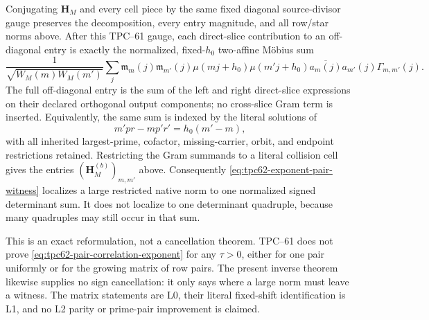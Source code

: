Conjugating \(\mathbf H_M\) and every cell piece by the same fixed diagonal
source-divisor gauge preserves the decomposition, every entry magnitude,
and all row/star norms above.  After this TPC--61 gauge, each direct-slice
contribution to an off-diagonal entry is exactly the normalized,
fixed-\(h_0\) two-affine M\"obius sum
\begin{equation}
 \frac{1}{\sqrt{W_M(m)W_M(m')}}
 \sum_j
 \mathfrak m_m(j)\mathfrak m_{m'}(j)
 \mu(mj+h_0)\mu(m'j+h_0)
 \overline{a_m(j)}a_{m'}(j)\Gamma_{m,m'}(j).
 \label{eq:tpc62-fixed-shift-pair-kernel}
\end{equation}
The full off-diagonal entry is the sum of the left and right direct-slice
expressions on their declared orthogonal output components; no cross-slice
Gram term is inserted.
Equivalently, the same sum is indexed by the literal solutions of
\begin{equation}
 m'pr-mp'r'=h_0(m'-m),
 \label{eq:tpc62-determinant-surface}
\end{equation}
with all inherited largest-prime, cofactor, missing-carrier, orbit, and
endpoint restrictions retained.  Restricting the Gram summands to a
literal collision cell gives the entries
\((\mathbf H_M^{(b)})_{m,m'}\) above.  Consequently
\eqref{eq:tpc62-exponent-pair-witness} localizes a large restricted native
norm to one normalized signed determinant sum.  It does not localize to one
determinant quadruple, because many quadruples may still occur in that sum.

This is an exact reformulation, not a cancellation theorem.  TPC--61 does
not prove \eqref{eq:tpc62-pair-correlation-exponent} for any
\(\tau>0\), either for one pair uniformly or for the growing matrix of row
pairs.  The present inverse theorem likewise supplies no sign cancellation:
it only says where a large norm must leave a witness.  The matrix statements
are L0, their literal fixed-shift identification is L1, and no L2 parity or
prime-pair improvement is claimed.
